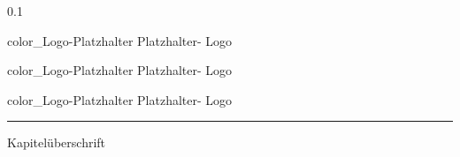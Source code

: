 \documentclass[xcolor=table,9pt,aspectratio=169]{beamer}
\begin{document}
\begin{frame}
\begin{overlayarea}{\textwidth}{0.1\paperheight}
\vspace*{1mm}
\begin{flushright}    
    \begin{minipage}{58mm}
    	\begin{flushright}    
    		\begin{minipage}{0.5\textwidth}
				\begin{beamercolorbox}[wd=14mm,ht=4mm,center]{color_Logo-Platzhalter}
    				\fontsize{3.5}{5} \selectfont  Platzhalter- \newline Logo  \vspace*{0.3mm}
    			\end{beamercolorbox} 
    		\end{minipage}
    		\begin{minipage}{0.5\textwidth}
				\begin{beamercolorbox}[wd=26mm,ht=4mm,center]{color_Logo-Platzhalter}
    				\fontsize{3.5}{5} \selectfont  Platzhalter- \newline Logo  \vspace*{0.3mm}
    			\end{beamercolorbox} 
    		\end{minipage}
   			\begin{minipage}{0.5\textwidth}
				\begin{beamercolorbox}[wd=14mm,ht=4mm,center]{color_Logo-Platzhalter}
    				\fontsize{3.5}{5} \selectfont  Platzhalter- \newline Logo  \vspace*{0.3mm}
   				\end{beamercolorbox} 
    		\end{minipage}
			{\color{red} \hrule}
    	\end{flushright}
    \end{minipage}
\end{flushright}

\end{overlayarea}
\end{frame}
\begin{frame}


\textcolor{uolblue}{\fontsize{16}{17}\selectfont{}Kapitelüberschrift}
\bigskip

 

\end{frame}
\end{document}
